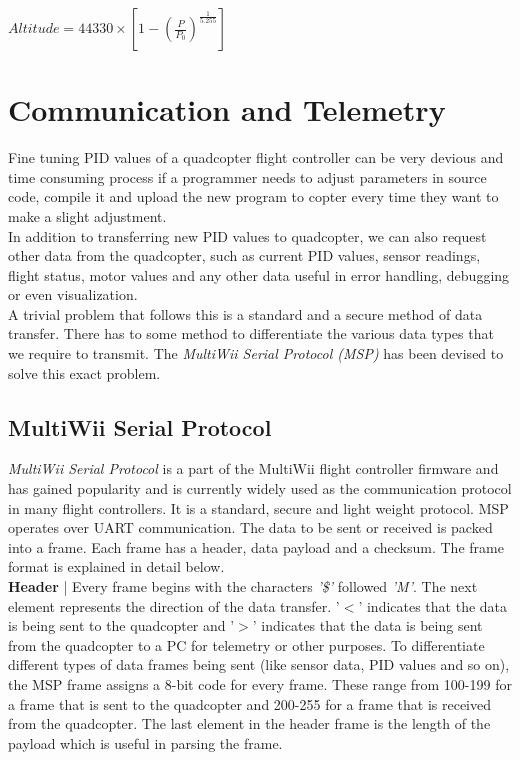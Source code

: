 \documentclass[a4paper,12pt,oneside]{book}
\begin{document}
\begin{minipage}{\textwidth}
\centering
$Altitude = 44330 \times \left [1 - \left (\frac{P}{P_{0}}\right )^{\frac{1}{5.255}} \right ]$
\end{minipage}
\clearpage

\section{Communication and Telemetry}
\label{sec:comm}
Fine tuning PID values of a quadcopter flight controller can be very devious and time consuming process if a programmer needs to adjust parameters in source code, compile it and upload the new program to copter every time they want to make a slight adjustment.\\ 

In addition to transferring new PID values to quadcopter, we can also request other data from the quadcopter, such as current PID values, sensor readings, flight status, motor values and any other data useful in error handling, debugging or even visualization.\\

A trivial problem that follows this is a standard and a secure method of data transfer. There has to some method to differentiate the various data types that we require to transmit. The \textit{MultiWii Serial Protocol (MSP)} has been devised to solve this exact problem.\\

\subsection{MultiWii Serial Protocol}
\textit{MultiWii Serial Protocol} is a part of the MultiWii flight controller firmware and has gained popularity and is currently widely used as the communication protocol in many flight controllers. It is a standard, secure and light weight protocol. MSP operates over UART communication. The data to be sent or received is packed into a frame. Each frame has a header, data payload and a checksum. The frame format is explained in detail below.\\

\textbf{Header} | Every frame begins with the characters \textit{'\$'} followed \textit{'M'}. The next element represents the direction of the data transfer. '$<$' indicates that the data is being sent to the quadcopter and '$>$' indicates that the data is being sent from the quadcopter to a PC for telemetry or other purposes. To differentiate different types of data frames being sent (like sensor data, PID values and so on), the MSP frame assigns a 8-bit code for every frame. These range from 100-199 for a frame that is sent to the quadcopter and 200-255 for a frame that is received from the quadcopter. The last element in the header frame is the length of the payload which is useful in parsing the frame.\\
\end{document}
